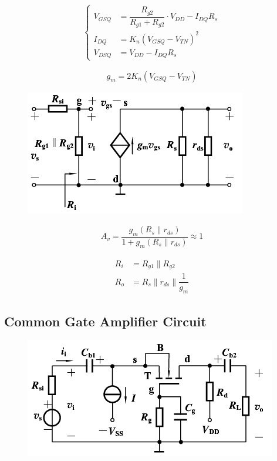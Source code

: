 \begin{equation*}
  \left\{
  \begin{aligned}
    V_{GSQ} &= \dfrac{R_{g2}}{R_{g1} + R_{g2}} \cdot V_{DD} - I_{DQ} R_s  \\
    I_{DQ} &= K_n \left( V_{GSQ} - V_{TN} \right)^2 \\
    V_{DSQ} &= V_{DD} - I_{DQ} R_s
  \end{aligned}
  \right.
\end{equation*}

\begin{equation*}
  \begin{aligned}
    g_m = 2 K_n \left( V_{GSQ} - V_{TN} \right)
  \end{aligned}
\end{equation*}

\begin{figure}[H]
  \centering
  \includegraphics[width=0.5\linewidth]{figures/MOSFET-Common-Ds}
  \label{fig:}
\end{figure}

\begin{equation*}
  \begin{aligned}
    A_v = \dfrac{g_m \left( R_s \parallel r_{ds} \right)}{1 + g_m \left( R_s \parallel r_{ds} \right)} \approx 1
  \end{aligned}
\end{equation*}

\begin{equation*}
  \begin{aligned}
    R_i &= R_{g1} \parallel R_{g2} \\
    R_o &= R_s \parallel r_{ds} \parallel \dfrac{1}{g_m} 
  \end{aligned}
\end{equation*}


\subsection{Common Gate Amplifier Circuit}

\begin{figure}[H]
  \centering
  \includegraphics[width=0.5\linewidth]{figures/MOSFET-Common-G}
  \label{fig:}
\end{figure}

